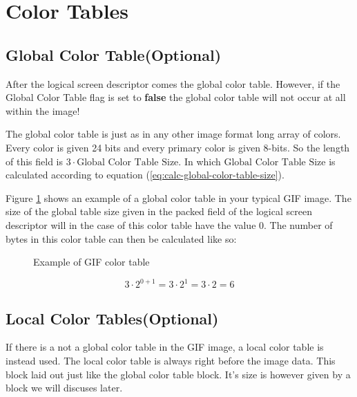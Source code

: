   \section{Color Tables}

  \subsection{Global Color Table(Optional)}

  After the logical screen descriptor comes the global color
  table. However, if the Global Color Table flag is set to
  \textbf{false} the global color table will not occur at all within
  the image!

  The global color table is just as in any other image format long
  array of colors. Every color is given 24 bits and every primary
  color is given 8-bits. So the length of this field is $3 \cdot
  \textrm{Global Color Table Size}$. In which $\textrm{Global Color
    Table Size}$ is calculated according to equation
  (\ref{eq:calc-global-color-table-size}).

  Figure \ref{fig:gif-color-table} shows an example of a global color
  table in your typical GIF image. The size of the global table size
  given in the packed field of the logical screen descriptor will in
  the case of this color table have the value $0$. The number of bytes
  in this color table can then be calculated like so:


  \begin{figure}
    \centering
    \caption{Example of GIF color table }
    \label{fig:gif-color-table}
  \end{figure}

  \begin{equation*}
    3 \cdot 2^{0 +1} = 3 \cdot 2^1 = 3 \cdot 2 = 6
  \end{equation*}

  \subsection{Local Color Tables(Optional)}

  If there is a not a global color table in the GIF image, a local
  color table is instead used. The local color table is always right
  before the image data. This block laid out just like the global
  color table block. It's size is however given by a block we will discuses
  later.


